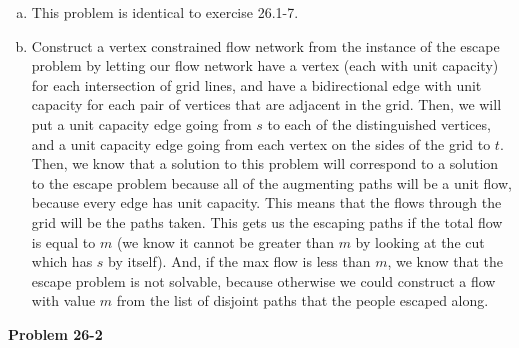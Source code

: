 \documentclass{article}
\begin{document}
\begin{enumerate}[a.]
\item
This problem is identical to exercise 26.1-7.
\item
Construct a vertex constrained flow network from the instance of the escape problem by letting our flow network have a vertex (each with unit capacity) for each intersection of grid lines, and have a bidirectional edge with unit capacity for each pair of vertices that are adjacent in the grid. Then, we will put a unit capacity edge going from $s$ to each of the distinguished vertices, and a unit capacity edge going from each vertex on the sides of the grid to $t$. Then, we know that a solution to this problem will correspond to a solution to the escape problem because all of the augmenting paths will be a unit flow, because every edge has unit capacity. This means that the flows through the grid will be the paths taken. This gets us the escaping paths if the total flow is equal to $m$ (we know it cannot be greater than $m$ by looking at the cut which has $s$ by itself). And, if the max flow is less than $m$, we know that the escape problem is not solvable, because otherwise we could construct a flow with value $m$ from the list of disjoint paths that the people escaped along.
\end{enumerate}

\noindent\textbf{Problem 26-2}\\
\end{document}

